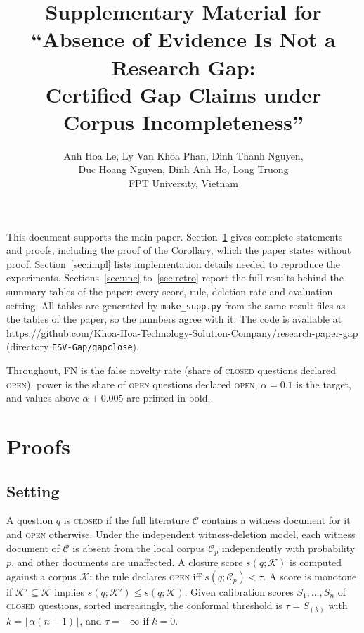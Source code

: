 \documentclass[10pt,a4paper]{article}
\title{Supplementary Material for\\``Absence of Evidence Is Not a Research Gap:\\Certified Gap Claims under Corpus Incompleteness''}
\author{Anh Hoa Le, Ly Van Khoa Phan, Dinh Thanh Nguyen,\\Duc Hoang Nguyen, Dinh Anh Ho, Long Truong\\FPT University, Vietnam}
\date{}
\theoremstyle{definition}
\theoremstyle{remark}
\newcommand{\open}{\textup{\textsc{open}}}
\newcommand{\closed}{\textup{\textsc{closed}}}
\begin{document}
\sloppy
\maketitle

\noindent This document supports the main paper. Section~\ref{sec:proofs} gives complete statements and proofs, including the proof of the Corollary, which the paper states without proof. Section~\ref{sec:impl} lists implementation details needed to reproduce the experiments. Sections~\ref{sec:unc} to~\ref{sec:retro} report the full results behind the summary tables of the paper: every score, rule, deletion rate and evaluation setting. All tables are generated by \texttt{make\_supp.py} from the same result files as the tables of the paper, so the numbers agree with it. The code is available at \url{https://github.com/Khoa-Hoa-Technology-Solution-Company/research-paper-gap} (directory \texttt{ESV-Gap/gapclose}).

Throughout, FN is the false novelty rate (share of \closed{} questions declared \open{}), power is the share of \open{} questions declared \open{}, $\alpha=0.1$ is the target, and values above $\alpha+0.005$ are printed in bold.

\section{Proofs}\label{sec:proofs}

\subsection{Setting}
A question $q$ is \closed{} if the full literature $\mathcal{C}$ contains a witness document for it and \open{} otherwise. Under the independent witness-deletion model, each witness document of $\mathcal{C}$ is absent from the local corpus $\mathcal{C}_p$ independently with probability $p$, and other documents are unaffected. A closure score $s(q;\mathcal{K})$ is computed against a corpus $\mathcal{K}$; the rule declares \open{} iff $s(q;\mathcal{C}_p)<\tau$. A score is monotone if $\mathcal{K}'\subseteq\mathcal{K}$ implies $s(q;\mathcal{K}')\le s(q;\mathcal{K})$. Given calibration scores $S_1,\dots,S_n$ of \closed{} questions, sorted increasingly, the conformal threshold is $\tau=S_{(k)}$ with $k=\lfloor\alpha(n+1)\rfloor$, and $\tau=-\infty$ if $k=0$.
\end{document}
